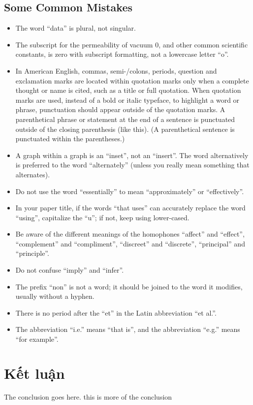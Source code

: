 \documentclass[9pt, conference, a4paper, compsocconf]{IEEEtran}
\begin{document}
\subsection{Some Common Mistakes}
\begin{itemize}
\item The word “data” is plural, not singular.
\item The subscript for the permeability of vacuum 0, and other common scientific constants, is zero with subscript formatting, not a lowercase letter “o”.
\item In American English, commas, semi-/colons, periods, question and exclamation marks are located within quotation marks only when a complete thought or name is cited, such as a title or full quotation. When quotation marks are used, instead of a bold or italic typeface, to highlight a word or phrase, punctuation should appear outside of the quotation marks. A parenthetical phrase or statement at the end of a sentence is punctuated outside of the closing parenthesis (like this). (A parenthetical sentence is punctuated within the parentheses.)
\item A graph within a graph is an “inset”, not an “insert”. The word alternatively is preferred to the word “alternately” (unless you really mean something that alternates).
\item Do not use the word “essentially” to mean “approximately” or “effectively”.
\item In your paper title, if the words “that uses” can accurately replace the word “using”, capitalize the “u”; if not, keep using lower-cased.
\item Be aware of the different meanings of the homophones “affect” and “effect”, “complement” and “compliment”, “discreet” and “discrete”, “principal” and “principle”.
\item Do not confuse “imply” and “infer”.
\item The prefix “non” is not a word; it should be joined to the word it modifies, usually without a hyphen.
\item There is no period after the “et” in the Latin abbreviation “et al.”.
\item The abbreviation “i.e.” means “that is”, and the abbreviation “e.g.” means “for example”.
\end{itemize}

\section{Kết luận}
The conclusion goes here. this is more of the conclusion
\end{document}
